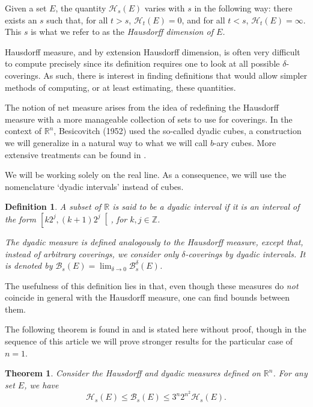 \documentclass[11pt, reqno]{amsart}
\newcommand{\R}{\mathbb{R}}
\newcommand{\Z}{\mathbb{Z}}
\newcommand{\HH}{\mathcal{H}}
\newcommand{\BB}{\mathcal{B}}
\newtheorem{theorem}{Theorem}
\newtheorem{definition}{Definition}
\begin{document}
Given a set $E$, the quantity $\HH_s(E)$ varies with $s$ in the following way: there exists an $s$ such that, for all $t > s$, $\HH_t(E) = 0$, and for all $t < s$, $\HH_t(E) = \infty$. This $s$ is what we refer to as the \emph{Hausdorff dimension of $E$.}

\smallskip

Hausdorff measure, and by extension Hausdorff dimension, is often very difficult to compute precisely since its definition requires one to look at all possible $\delta$-coverings. As such, there is interest in finding definitions that would allow simpler methods of computing, or at least estimating, these quantities.   

The notion of net measure arises from the idea of redefining the Hausdorff measure with a more manageable collection of sets to use for coverings. In the context of $\R^n$, Besicovitch (1952) used the so-called dyadic cubes, a construction we will generalize in a natural way to what we will call $b$-ary cubes. More extensive treatments can be found in \cite{falconer, rogers}.

We will be working solely on the real line. As a consequence, we will use the nomenclature `dyadic intervals' instead of cubes.

\begin{definition}
A subset of $\R$ is said to be a \emph{dyadic interval} if it is an interval of the form $\left[ k 2^j, (k+1) 2^j \right[$, for $k, j \in \Z$.

The dyadic measure is defined analogously to the Hausdorff measure, except that, instead of arbitrary coverings, we consider only $\delta$-coverings by dyadic intervals. It is denoted by $\BB_s(E) = \lim_{\delta \to 0} \BB_s^\delta(E)$.
\end{definition}

The usefulness of this definition lies in that, even though these measures do \emph{not} coincide in general with the Hausdorff measure, one can find bounds between them.

The following theorem is found in \cite{falconer, rogers} and is stated here without proof, though in the sequence of this article we will prove stronger results for the particular case of $n = 1$.

\begin{theorem}\label{badbound}
Consider the Hausdorff and dyadic measures defined on $\R^n$. For any set $E$, we have
\begin{equation}\label{badboundeq}
\HH_s(E) \leq \BB_s(E) \leq 3^n 2^{n^2} \HH_s(E).
\end{equation}
\end{theorem}
\end{document}
